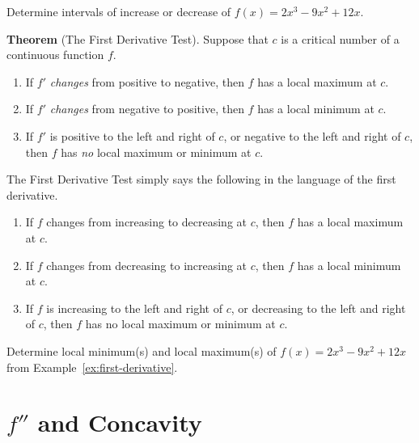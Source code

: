 \documentclass[../main.tex]{subfiles}
\begin{document}

\clearpage

\begin{example} \label{ex:first-derivative}
  Determine intervals of increase or decrease of \(f(x) = 2x^{3} - 9x^{2} + 12x\).
\end{example}
\clearpage

\begin{mdframed}[style=withref]
  \textbf{Theorem} (The First Derivative Test). Suppose that \(c\) is a critical number of a continuous function \(f\). 
  \begin{enumerate}
    \item  If \(f'\) \emph{changes} from positive to negative, then \(f\) has a local maximum at \(c\).
    \item  If \(f'\) \emph{changes} from negative to positive, then \(f\) has a local minimum at \(c\).
    \item  If \(f'\) is positive to the left and right of \(c\), or negative to the left and right of \(c\), then \(f\) has \emph{no} local maximum or minimum at \(c\).
  \end{enumerate}

\end{mdframed}
The First Derivative Test simply says the following in the language of the first derivative. 
\begin{enumerate}
  \item If \(f\) changes from {increasing} to {decreasing} at \(c\), then \(f\) has a local maximum at \(c\).
  \item If \(f\) changes from {decreasing} to {increasing} at \(c\), then \(f\) has a local minimum at \(c\).
  \item If \(f\) is {increasing} to the left and right of \(c\), or {decreasing} to the left and right of \(c\), then \(f\) has no local maximum or minimum at \(c\).
\end{enumerate}
\bigskip

\begin{example}
  Determine local minimum(s) and local maximum(s) of \(f(x) = 2x^{3} - 9x^{2} + 12x\) from Example~\ref{ex:first-derivative}.
\end{example}
\clearpage

\section{\(f''\) and Concavity}
\end{document}
